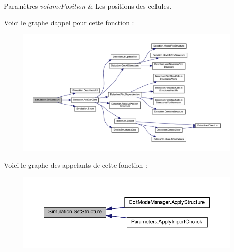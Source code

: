 \begin{DoxyParams}{Paramètres}
{\em volume\+Position} & Les positions des cellules.\\
\hline
\end{DoxyParams}
Voici le graphe d\textquotesingle{}appel pour cette fonction \+:
\nopagebreak
\begin{figure}[H]
\begin{center}
\leavevmode
\includegraphics[width=350pt]{class_simulation_a775498931843884fbc6c08de3b2b1afd_cgraph}
\end{center}
\end{figure}
Voici le graphe des appelants de cette fonction \+:
\nopagebreak
\begin{figure}[H]
\begin{center}
\leavevmode
\includegraphics[width=350pt]{class_simulation_a775498931843884fbc6c08de3b2b1afd_icgraph}
\end{center}
\end{figure}
\mbox{\label{class_simulation_af1580cd4ce5cb935c5f55ad4ce4f94de}} 
